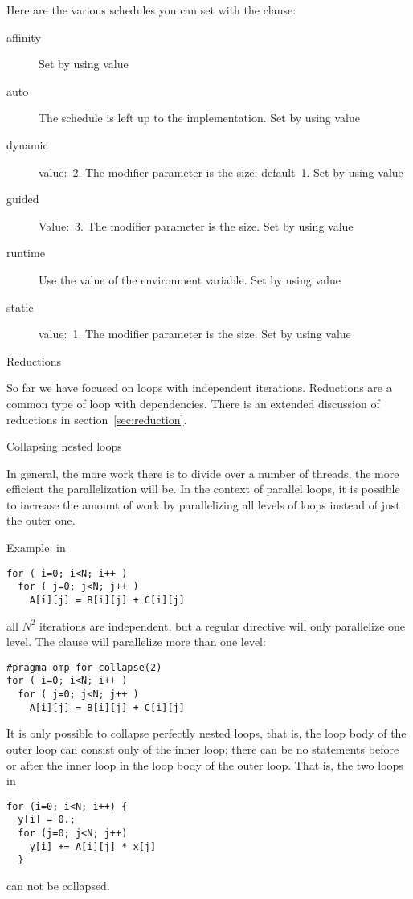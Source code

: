 Here are the various schedules you can set with the
 clause:
\begin{description}
  \item[affinity] Set by using value  
  \item[auto] The schedule is left up to the implementation. Set by
    using value 
  \item[dynamic] value:~2. The modifier parameter is the
     size; default~1. Set by using value
  \item[guided] Value:~3. The modifier parameter is the
     size. Set by using value
  \item[runtime] Use the value of the 
    environment variable. Set by using value
  \item[static] value:~1. The modifier parameter is the  size. Set by using value  
\end{description}

 {Reductions}

So far we have focused on loops with independent iterations.
Reductions are a common type of loop with dependencies.
There is an extended discussion of reductions in section~\ref{sec:reduction}.

 {Collapsing nested loops}

In general, the more work there is to divide over a number of threads,
the more efficient the parallelization will be. In the context of
parallel loops, it is possible to increase the amount of work by
parallelizing all levels of loops instead of just the outer one.

Example: in
\begin{lstlisting}
for ( i=0; i<N; i++ )
  for ( j=0; j<N; j++ )
    A[i][j] = B[i][j] + C[i][j] 
\end{lstlisting}
all $N^2$ iterations are independent, but a regular 
directive will only parallelize one level. The 
clause will parallelize more than one level:
\begin{lstlisting}
#pragma omp for collapse(2)
for ( i=0; i<N; i++ )
  for ( j=0; j<N; j++ )
    A[i][j] = B[i][j] + C[i][j] 
\end{lstlisting}
It is only possible to collapse perfectly nested loops, that is, the
loop body of the outer loop can consist only of the inner loop; there
can be no statements before or after the inner loop in the loop body
of the outer loop. That is, the two loops in
\begin{lstlisting}
for (i=0; i<N; i++) {
  y[i] = 0.;
  for (j=0; j<N; j++)
    y[i] += A[i][j] * x[j]
  }
\end{lstlisting}
can not be collapsed.

